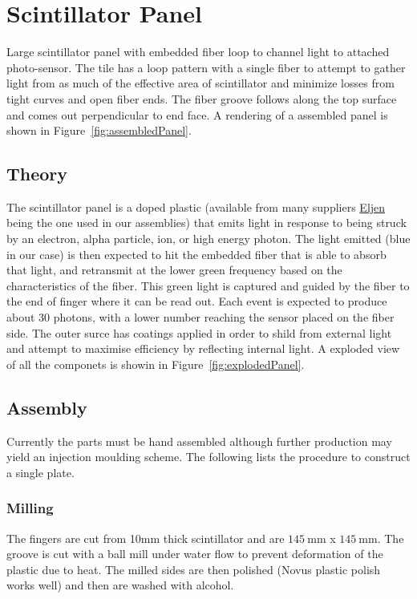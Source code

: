 \section{Scintillator Panel}
Large scintillator panel with embedded fiber loop to channel light to attached photo-sensor. The tile has a loop pattern with a single fiber to attempt to gather light from as much of the effective area of scintillator and minimize losses from tight curves and open fiber ends. The fiber groove follows along the top surface and comes out perpendicular to end face. A rendering of a assembled panel is shown in Figure~\ref{fig:assembledPanel}.


\subsection{Theory}
The scintillator panel is a doped plastic (available from many suppliers \href{http://www.eljentechnology.com/}{Eljen} being the one used in our assemblies) that emits light in response to being struck by an electron, alpha particle, ion, or high energy photon. The light emitted (blue in our case) is then expected to hit the embedded fiber that is able to absorb that light, and retransmit at the lower green frequency based on the characteristics of the fiber. This green light is captured and guided by the fiber to the end of finger where it can be read out. Each event is expected to produce about 30 photons, with a lower number reaching the sensor placed on the fiber side. The outer surce has coatings applied in order to shild from external light and attempt to maximise efficiency by reflecting internal light. A exploded view of all the componets is showin in Figure~\ref{fig:explodedPanel}.

\subsection{Assembly}
Currently the parts must be hand assembled although further production may yield an injection moulding scheme. The following lists the procedure to construct a single plate.

\subsubsection{Milling}
The fingers are cut from 10mm thick scintillator and are $\SI{145}{\milli\meter}$ x $\SI{145}{\milli\meter}$. The groove is cut with a ball mill under water flow to prevent deformation of the plastic due to heat. The milled sides are then polished (Novus plastic polish works well) and then are washed with alcohol.

